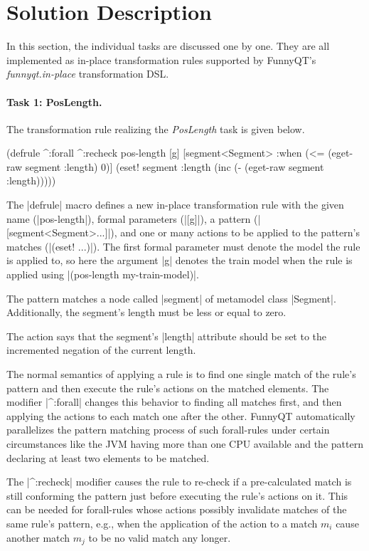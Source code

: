 \documentclass[submission]{eptcs}
\newcommand{\code}{\clojureinline}
\begin{document}
\section{Solution Description}
\label{sec:solution-description}

In this section, the individual tasks are discussed one by one.  They are all
implemented as in-place transformation rules supported by FunnyQT's
\emph{funnyqt.in-place} transformation DSL.

\paragraph{Task 1: PosLength.}

The transformation rule realizing the \emph{PosLength} task is given below.

\begin{clojurecode}
(defrule ^:forall ^:recheck pos-length [g]
  [segment<Segment>
   :when (<= (eget-raw segment :length) 0)]
  (eset! segment :length (inc (- (eget-raw segment :length)))))
\end{clojurecode}

The \code|defrule| macro defines a new in-place transformation rule with the
given name (\code|pos-length|), formal parameters (\code|[g]|), a pattern
(\code|[segment<Segment>...]|), and one or many actions to be applied to the
pattern's matches (\code|(eset! ...)|).  The first formal parameter must denote
the model the rule is applied to, so here the argument \code|g| denotes the
train model when the rule is applied using \code|(pos-length my-train-model)|.

The pattern matches a node called \code|segment| of metamodel class
\code|Segment|.  Additionally, the segment's length must be less or equal to
zero.

The action says that the segment's \code|length| attribute should be set to the
incremented negation of the current length.

The normal semantics of applying a rule is to find one single match of the
rule's pattern and then execute the rule's actions on the matched elements.
The modifier \code|^:forall| changes this behavior to finding all matches
first, and then applying the actions to each match one after the other.
FunnyQT automatically parallelizes the pattern matching process of such
forall-rules under certain circumstances like the JVM having more than one CPU
available and the pattern declaring at least two elements to be matched.

The \code|^:recheck| modifier causes the rule to re-check if a pre-calculated
match is still conforming the pattern just before executing the rule's actions
on it.  This can be needed for forall-rules whose actions possibly invalidate
matches of the same rule's pattern, e.g., when the application of the action to
a match \(m_i\) cause another match \(m_j\) to be no valid match any longer.
\end{document}
